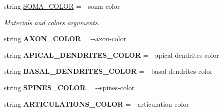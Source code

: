 \begin{DoxyCompactItemize}
\item 
string \hyperlink{classmeshy_1_1neuromorphovis_1_1interface_1_1cli_1_1args_1_1Args_aac0cd0fc89f6a4704ba2d95a6537dcec}{S\+O\+M\+A\+\_\+\+C\+O\+L\+OR} = \textquotesingle{}-\/-\/soma-\/color\textquotesingle{}
\begin{DoxyCompactList}\small\item\em Materials and colors arguments. \end{DoxyCompactList}\item 
string {\bfseries A\+X\+O\+N\+\_\+\+C\+O\+L\+OR} = \textquotesingle{}-\/-\/axon-\/color\textquotesingle{}\hypertarget{classmeshy_1_1neuromorphovis_1_1interface_1_1cli_1_1args_1_1Args_a41d4ab3de338e1e044c37af7f552f0f1}{}\label{classmeshy_1_1neuromorphovis_1_1interface_1_1cli_1_1args_1_1Args_a41d4ab3de338e1e044c37af7f552f0f1}

\item 
string {\bfseries A\+P\+I\+C\+A\+L\+\_\+\+D\+E\+N\+D\+R\+I\+T\+E\+S\+\_\+\+C\+O\+L\+OR} = \textquotesingle{}-\/-\/apical-\/dendrites-\/color\textquotesingle{}\hypertarget{classmeshy_1_1neuromorphovis_1_1interface_1_1cli_1_1args_1_1Args_afc311e4a25a42fc6ee903289c2f516cb}{}\label{classmeshy_1_1neuromorphovis_1_1interface_1_1cli_1_1args_1_1Args_afc311e4a25a42fc6ee903289c2f516cb}

\item 
string {\bfseries B\+A\+S\+A\+L\+\_\+\+D\+E\+N\+D\+R\+I\+T\+E\+S\+\_\+\+C\+O\+L\+OR} = \textquotesingle{}-\/-\/basal-\/dendrites-\/color\textquotesingle{}\hypertarget{classmeshy_1_1neuromorphovis_1_1interface_1_1cli_1_1args_1_1Args_a19f07bae297114fd43d60e1ef6d7fea1}{}\label{classmeshy_1_1neuromorphovis_1_1interface_1_1cli_1_1args_1_1Args_a19f07bae297114fd43d60e1ef6d7fea1}

\item 
string {\bfseries S\+P\+I\+N\+E\+S\+\_\+\+C\+O\+L\+OR} = \textquotesingle{}-\/-\/spines-\/color\textquotesingle{}\hypertarget{classmeshy_1_1neuromorphovis_1_1interface_1_1cli_1_1args_1_1Args_abd207165cd929088cc69cf2d3bf01f81}{}\label{classmeshy_1_1neuromorphovis_1_1interface_1_1cli_1_1args_1_1Args_abd207165cd929088cc69cf2d3bf01f81}

\item 
string {\bfseries A\+R\+T\+I\+C\+U\+L\+A\+T\+I\+O\+N\+S\+\_\+\+C\+O\+L\+OR} = \textquotesingle{}-\/-\/articulation-\/color\textquotesingle{}\hypertarget{classmeshy_1_1neuromorphovis_1_1interface_1_1cli_1_1args_1_1Args_a4d952434dd09f53ed1dd6f965697117c}{}\label{classmeshy_1_1neuromorphovis_1_1interface_1_1cli_1_1args_1_1Args_a4d952434dd09f53ed1dd6f965697117c}


\end{DoxyCompactItemize}
